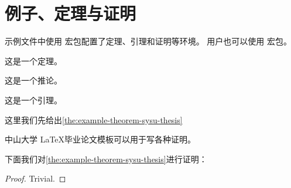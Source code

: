 \section{例子、定理与证明}

示例文件中使用  宏包配置了定理、引理和证明等环境。
用户也可以使用  宏包。

\begin{theorem}[定理例子]
    \label{the:example-theorem}
    这是一个定理。
\end{theorem}

\begin{corollary}[推论例子]
    \label{the:example-corollary}
    这是一个推论。
\end{corollary}

\begin{lemma}[引理例子]
    \label{the:example-lemma}
    这是一个引理。
\end{lemma}

这里我们先给出\autoref{the:example-theorem-sysu-thesis}

\begin{theorem}[中山大学毕业论文模板定理]
    \label{the:example-theorem-sysu-thesis}
    中山大学 \LaTeX 毕业论文模板可以用于写各种证明。
\end{theorem}

下面我们对\autoref{the:example-theorem-sysu-thesis}进行证明：


\begin{proof}
  Trivial.
\end{proof}